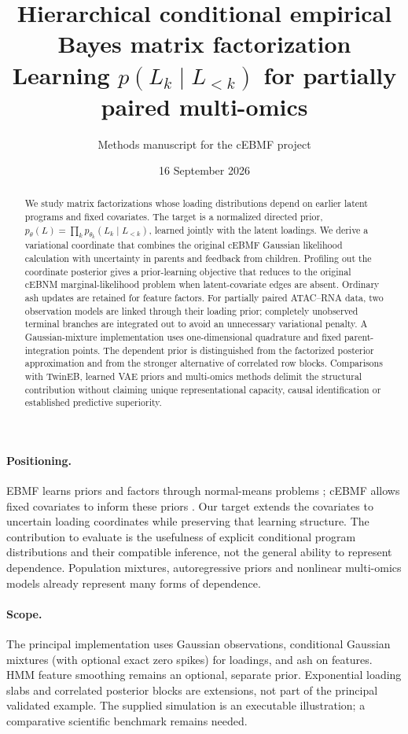 \documentclass[11pt,a4paper]{article}
\title{\textbf{Hierarchical conditional empirical Bayes
matrix factorization}\\[7pt]
\Large Learning $p(L_k\mid L_{<k})$ for partially paired multi-omics}
\author{Methods manuscript for the cEBMF project}
\date{16 September 2026}
\begin{document}
\maketitle
\thispagestyle{fancy}
\begin{abstract}
We study matrix factorizations whose loading distributions depend on earlier
latent programs and fixed covariates. The target is a normalized directed
prior, $p_\theta(L)=\prod_k p_{\theta_k}(L_k\mid L_{<k})$, learned jointly
with the latent loadings. We derive a variational coordinate that combines
the original cEBMF Gaussian likelihood calculation with uncertainty in
parents and feedback from children. Profiling out the coordinate posterior
gives a prior-learning objective that reduces to the original cEBNM
marginal-likelihood problem when latent-covariate edges are absent.
Ordinary ash updates are retained for feature factors. For partially paired
ATAC--RNA data, two observation models are linked through their loading
prior; completely unobserved terminal branches are integrated out to avoid
an unnecessary variational penalty. A Gaussian-mixture implementation uses
one-dimensional quadrature and fixed parent-integration points. The dependent
prior is distinguished from the factorized posterior approximation and from
the stronger alternative of correlated row blocks. Comparisons with TwinEB,
learned VAE priors and multi-omics methods delimit the structural contribution
without claiming unique representational capacity, causal identification or
established predictive superiority.
\end{abstract}

\paragraph{Positioning.}
EBMF learns priors and factors through normal-means problems \cite{wang};
cEBMF allows fixed covariates to inform these priors \cite{cebmf}. Our target
extends the covariates to uncertain loading coordinates while preserving
that learning structure. The contribution to evaluate is the usefulness of
explicit conditional program distributions and their compatible inference,
not the general ability to represent dependence. Population mixtures,
autoregressive priors and nonlinear multi-omics models already represent
many forms of dependence.

\paragraph{Scope.}
The principal implementation uses Gaussian observations, conditional
Gaussian mixtures (with optional exact zero spikes) for loadings, and ash
on features. HMM feature smoothing remains an optional, separate prior.
Exponential loading slabs and correlated posterior blocks are extensions,
not part of the principal validated example. The supplied simulation is an
executable illustration; a comparative scientific benchmark remains needed.
\clearpage
\end{document}
